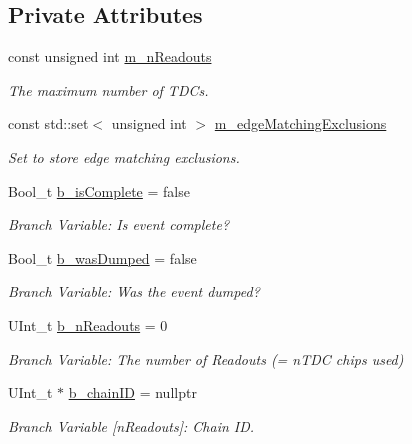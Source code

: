 \subsection*{Private Attributes}
\begin{DoxyCompactItemize}
\item 
const unsigned int \hyperlink{class_event_tree_manager_ac0fce7275ef1c587302ff67e53ad5a77}{m\+\_\+n\+Readouts}
\begin{DoxyCompactList}\small\item\em The maximum number of T\+D\+Cs. \end{DoxyCompactList}\item 
const std\+::set$<$ unsigned int $>$ \hyperlink{class_event_tree_manager_aea70f1feef081fb124517ba8efc4087b}{m\+\_\+edge\+Matching\+Exclusions}
\begin{DoxyCompactList}\small\item\em Set to store edge matching exclusions. \end{DoxyCompactList}\item 
Bool\+\_\+t \hyperlink{class_event_tree_manager_a6e9b9bd6363f95fce295b19cb544ea83}{b\+\_\+is\+Complete} = false
\begin{DoxyCompactList}\small\item\em Branch Variable\+: Is event complete? \end{DoxyCompactList}\item 
Bool\+\_\+t \hyperlink{class_event_tree_manager_ab99e54a6c2d4c59bb073038649b3ae4f}{b\+\_\+was\+Dumped} = false
\begin{DoxyCompactList}\small\item\em Branch Variable\+: Was the event dumped? \end{DoxyCompactList}\item 
U\+Int\+\_\+t \hyperlink{class_event_tree_manager_a423068e1ef8766b602d5383bfe38494b}{b\+\_\+n\+Readouts} = 0
\begin{DoxyCompactList}\small\item\em Branch Variable\+: The number of Readouts (= n\+T\+DC chips used) \end{DoxyCompactList}\item 
U\+Int\+\_\+t $\ast$ \hyperlink{class_event_tree_manager_acad948110ea80051649765fdbed3fc91}{b\+\_\+chain\+ID} = nullptr
\begin{DoxyCompactList}\small\item\em Branch Variable \mbox{[}n\+Readouts\mbox{]}\+: Chain ID. \end{DoxyCompactList}\item 

\end{DoxyCompactItemize}
